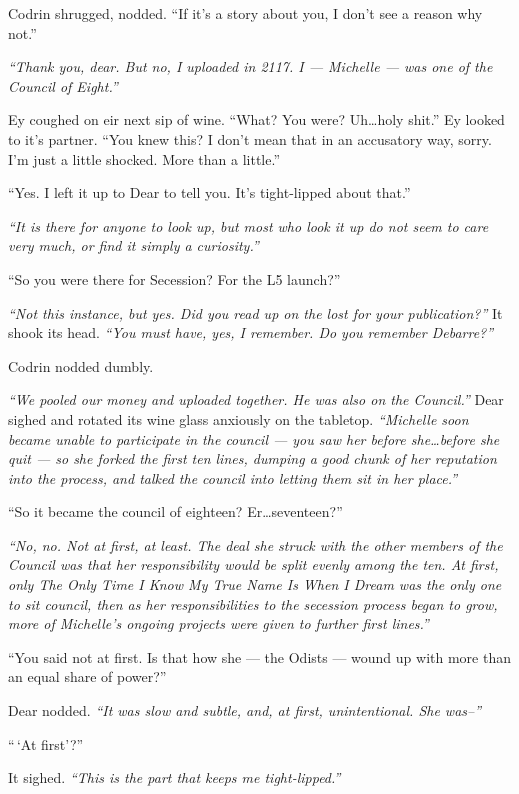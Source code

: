 Codrin shrugged, nodded. ``If it's a story about you, I don't see a reason why not.''

\emph{``Thank you, dear. But no, I uploaded in 2117. I — Michelle — was one of the Council of Eight.''}

Ey coughed on eir next sip of wine. ``What? You were? Uh\ldots holy shit.'' Ey looked to it's partner. ``You knew this? I don't mean that in an accusatory way, sorry. I'm just a little shocked. More than a little.''

``Yes. I left it up to Dear to tell you. It's tight-lipped about that.''

\emph{``It is there for anyone to look up, but most who look it up do not seem to care very much, or find it simply a curiosity.''}

``So you were there for Secession? For the L5 launch?''

\emph{``Not this instance, but yes. Did you read up on the lost for your publication?''} It shook its head. \emph{``You must have, yes, I remember. Do you remember Debarre?''}

Codrin nodded dumbly.

\emph{``We pooled our money and uploaded together. He was also on the Council.''} Dear sighed and rotated its wine glass anxiously on the tabletop. \emph{``Michelle soon became unable to participate in the council — you saw her before she\ldots before she quit — so she forked the first ten lines, dumping a good chunk of her reputation into the process, and talked the council into letting them sit in her place.''}

``So it became the council of eighteen? Er\ldots seventeen?''

\emph{``No, no. Not at first, at least. The deal she struck with the other members of the Council was that her responsibility would be split evenly among the ten. At first, only The Only Time I Know My True Name Is When I Dream was the only one to sit council, then as her responsibilities to the secession process began to grow, more of Michelle's ongoing projects were given to further first lines.''}

``You said not at first. Is that how she — the Odists — wound up with more than an equal share of power?''

Dear nodded. \emph{``It was slow and subtle, and, at first, unintentional. She was--''}

``\,`At first'?''

It sighed. \emph{``This is the part that keeps me tight-lipped.''}

